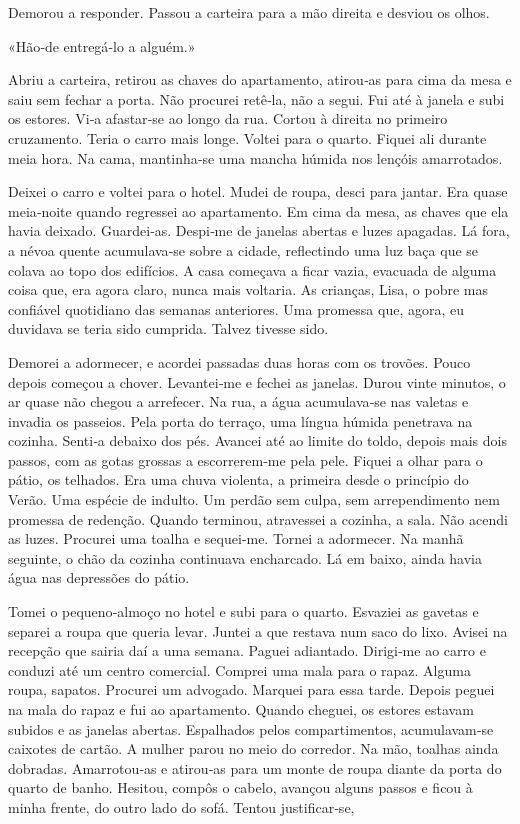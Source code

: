 Demorou a responder. Passou a carteira para a mão direita e desviou os
olhos.

«Hão­‑de entregá­‑lo a alguém.»

Abriu a carteira, retirou as chaves do apartamento, atirou­‑as para cima
da mesa e saiu sem fechar a porta. Não procurei retê­‑la, não a segui.
Fui até à janela e subi os estores. Vi­‑a afastar­‑se ao longo da rua.
Cortou à direita no primeiro cruzamento. Teria o carro mais longe.
Voltei para o quarto. Fiquei ali durante meia hora. Na cama,
mantinha­‑se uma mancha húmida nos lençóis amarrotados.

Deixei o carro e voltei para o hotel. Mudei de roupa, desci para jantar.
Era quase meia­‑noite quando regressei ao apartamento. Em cima da mesa,
as chaves que ela havia deixado. Guardei­‑as. Despi­‑me de janelas
abertas e luzes apagadas. Lá fora, a névoa quente acumulava­‑se sobre a
cidade, reflectindo uma luz baça que se colava ao topo dos edifícios. A
casa começava a ficar vazia, evacuada de alguma coisa que, era agora
claro, nunca mais voltaria. As crianças, Lisa, o pobre mas confiável
quotidiano das semanas anteriores. Uma promessa que, agora, eu duvidava
se teria sido cumprida. Talvez tivesse sido.

Demorei a adormecer, e acordei passadas duas horas com os trovões. Pouco
depois começou a chover. Levantei­‑me e fechei as janelas. Durou vinte
minutos, o ar quase não chegou a arrefecer. Na rua, a água acumulava­‑se
nas valetas e invadia os passeios. Pela porta do terraço, uma língua
húmida penetrava na cozinha. Senti­‑a debaixo dos pés. Avancei até ao
limite do toldo, depois mais dois passos, com as gotas grossas a
escorrerem­‑me pela pele. Fiquei a olhar para o pátio, os telhados. Era
uma chuva violenta, a primeira desde o princípio do Verão. Uma espécie
de indulto. Um perdão sem culpa, sem arrependimento nem promessa de
redenção. Quando terminou, atravessei a cozinha, a sala. Não acendi as
luzes. Procurei uma toalha e sequei­‑me. Tornei a adormecer. Na manhã
seguinte, o chão da cozinha continuava encharcado. Lá em baixo, ainda
havia água nas depressões do pátio.

Tomei o pequeno­‑almoço no hotel e subi para o quarto. Esvaziei as
gavetas e separei a roupa que queria levar. Juntei a que restava num
saco do lixo. Avisei na recepção que sairia daí a uma semana. Paguei
adiantado. Dirigi­‑me ao carro e conduzi até um centro comercial.
Comprei uma mala para o rapaz. Alguma roupa, sapatos. Procurei um
advogado. Marquei para essa tarde. Depois peguei na mala do rapaz e fui
ao apartamento. Quando cheguei, os estores estavam subidos e as janelas
abertas. Espalhados pelos compartimentos, acumulavam­‑se caixotes de
cartão. A mulher parou no meio do corredor. Na mão, toalhas ainda
dobradas. Amarrotou­‑as e atirou­‑as para um monte de roupa diante da
porta do quarto de banho. Hesitou, compôs o cabelo, avançou alguns
passos e ficou à minha frente, do outro lado do sofá. Tentou
justificar­‑se,


